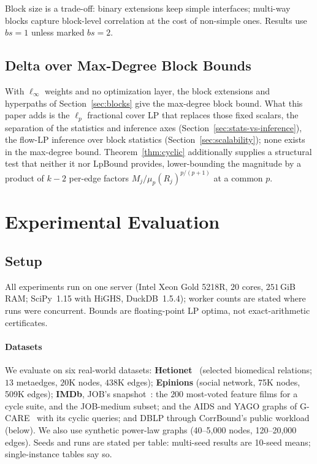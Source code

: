\documentclass[sigconf, nonacm, acmthm=false]{acmart}
\newcommand{\rel}{R}
\begin{document}
Block size is a trade-off: binary extensions keep simple
interfaces; multi-way blocks capture block-level correlation at the cost
of non-simple ones. Results use $bs{=}1$ unless marked $bs{=}2$.

\subsection{Delta over Max-Degree Block Bounds}

With $\ell_\infty$ weights and no optimization layer, the block extensions
and hyperpaths of Section~\ref{sec:blocks} give the max-degree block bound.
What this paper adds is the $\ell_p$ fractional cover
LP that replaces those fixed scalars, the separation of the statistics and
inference axes (Section~\ref{sec:stats-vs-inference}), the flow-LP
inference over block statistics (Section~\ref{sec:scalability});
none exists in the max-degree bound. Theorem~\ref{thm:cyclic}
additionally supplies a structural test that neither it nor LpBound provides,
lower-bounding the magnitude by a product of $k-2$ per-edge factors
$M_j / \mu_p(\rel_j)^{p/(p+1)}$ at a common $p$.

\section{Experimental Evaluation}
\label{sec:experiments}

\subsection{Setup}
All experiments run on one server (Intel Xeon Gold 5218R, $20$ cores, $251$\,GiB RAM; SciPy~1.15 with HiGHS, DuckDB~1.5.4); worker counts are stated where runs were concurrent. Bounds are floating-point LP optima, not exact-arithmetic certificates.

\paragraph{Datasets}
We evaluate on six real-world datasets:
\textbf{Hetionet}~\cite{himmelstein2017hetionet} (selected biomedical relations; $13$ metaedges, $20$K nodes, $438$K edges);
\textbf{Epinions} (social network, 75K nodes, 509K edges);
\textbf{IMDb}, JOB's snapshot~\cite{leis2015goodare}: the $200$
most-voted feature films for a cycle suite, and the JOB-medium subset;
and the AIDS and YAGO graphs of G-CARE~\cite{park2020gcare} with its
cyclic queries; and DBLP through CorrBound's public workload (below).
We also use synthetic power-law graphs (40--5{,}000 nodes, 120--20{,}000 edges).
Seeds and runs are stated per table: multi-seed results are 10-seed
means; single-instance tables say so.
\end{document}

